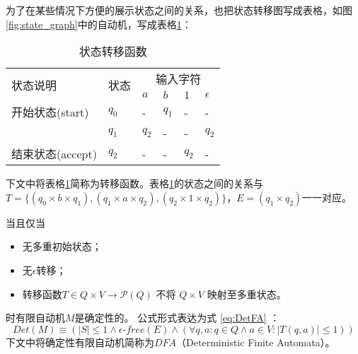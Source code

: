 为了在某些情况下方便的展示状态之间的关系，也把状态转移图写成表格\cite{book1}，如图\ref{fig:state_graph}中的自动机，写成表格\ref{tab:sample}：
\begin{table}[!htbp]
    \caption{状态转移函数}
    \label{tab:sample}
    \centering
    \small%
    \setlength{\tabcolsep}{4pt}%
    \renewcommand{\arraystretch}{1.2}%
    \begin{tabular}{l p{4em}<{\centering} p{1em}<{\centering} p{1em}<{\centering} p{1em}<{\centering} p{1em}<{\centering}} 
        \toprule%
        \multirow{2}{*}{状态说明} & \multirow{2}{*}{状态} & \multicolumn{4}{c}{输入字符} \\
		\cline{3-6}      &    &$a$ & $b$ & $1$ & $\epsilon$ \\
        \midrule%
        开始状态(start)  & $q_0$ & -     & $q_1$  &      - &     -    \\
                        & $q_1$ & $q_2$ &    -   &    -   &    $q_2$ \\
        结束状态(accept) & $q_2$ &   -   & -      & $q_2$  &    -     \\
        \bottomrule%
    \end{tabular}
\end{table}

下文中将表格\ref{tab:sample}简称为转移函数。表格\ref{tab:sample}的状态之间的关系与$T=\{(q_0 \times b \times q_1),(q_1\times a \times q_2),(q_2\times 1 \times q_2)\}$，$E=(q_1 \times q_2)$一一对应。

\begin{definition}[确定性有限自动机]
    当且仅当 
    \begin{itemize}
        \item 无多重初始状态；
        \item 无$\epsilon$转移；
        \item 转移函数$T \in Q \times V \longrightarrow \mathcal{P} (Q) $ 不将 $Q \times V$ 映射至多重状态。
    \end{itemize}
    时有限自动机$M$是确定性的。
    公式形式表达为式 \ref{eq:DetFA} ：
    \begin{equation}\label{eq:DetFA}
    Det(M) \equiv ( |S| \leq 1 \land \epsilon\mbox{-} free(E) \land ( \forall q,a:q \in Q \land a \in V : |T(q,a)| \leq 1 )) 
    \end{equation}
    下文中将确定性有限自动机简称为$DFA$（Deterministic Finite Automata）。
\end{definition}

